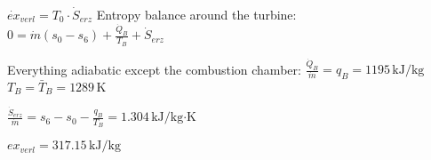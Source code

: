 \( \dot{ex}_{verl} = T_0 \cdot \dot{S}_{erz} \)  
Entropy balance around the turbine:  
\( 0 = \dot{m} (s_0 - s_6) + \frac{\dot{Q}_B}{T_B} + \dot{S}_{erz} \)  

Everything adiabatic except the combustion chamber:  
\( \frac{\dot{Q}_B}{\dot{m}} = q_B = 1195 \, \text{kJ/kg} \)  
\( T_B = \bar{T}_B = 1289 \, \text{K} \)  

\( \frac{\dot{S}_{erz}}{\dot{m}} = s_6 - s_0 - \frac{q_B}{T_B} = 1.304 \, \text{kJ/kg·K} \)  

\( ex_{verl} = 317.15 \, \text{kJ/kg} \)